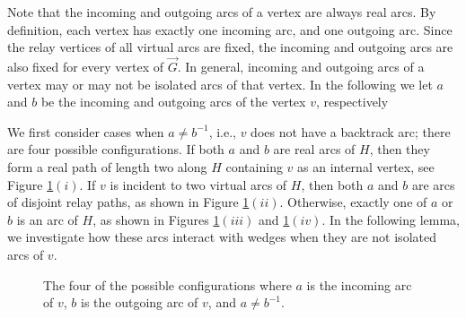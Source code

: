 \documentclass[12pt,letterpaper,oneside]{book}
\begin{document}
Note that the incoming and outgoing  
arcs of a vertex are always real arcs.  By definition,  
each vertex has exactly one incoming arc, and one outgoing arc.  
Since the relay vertices of all virtual arcs are fixed, the incoming and 
outgoing arcs 
are also fixed for every vertex of $\vec{G}$.  In general, incoming and outgoing arcs of a vertex 
may or may not be isolated arcs of that vertex.  %
In the following we let $a$ and $b$ 
be the incoming and outgoing arcs of the vertex $v$, respectively

We first consider cases when $a\ne b^{-1}$, i.e., $v$ does not have a backtrack arc; there are four possible 
configurations.  If both $a$ and $b$ are 
real arcs of $H$, then they form a real path of length two along $H$ containing $v$ as an internal vertex, see Figure \ref{fig:iowedge}$(i)$.  
If $v$ is incident 
to two virtual arcs of $H$, then both $a$ and $b$ are arcs of disjoint relay paths, as shown in Figure \ref{fig:iowedge}$(ii)$.  Otherwise, 
exactly one of $a$ or $b$ is an arc of $H$, as shown in Figures 
\ref{fig:iowedge}$(iii)$ and \ref{fig:iowedge}$(iv)$.  
In the following lemma, we investigate how these arcs interact with wedges when they are not isolated arcs of $v$.  

\begin{figure}[htp] 
\centering 
{} 
\caption[The incoming and outgoing arcs of a vertex]
{The four of the possible configurations where $a$ is the incoming arc of $v$, $b$ is the outgoing arc of $v$, and $a\ne b^{-1}$.
\label{fig:iowedge}}
\end{figure} 
 
\end{document}
